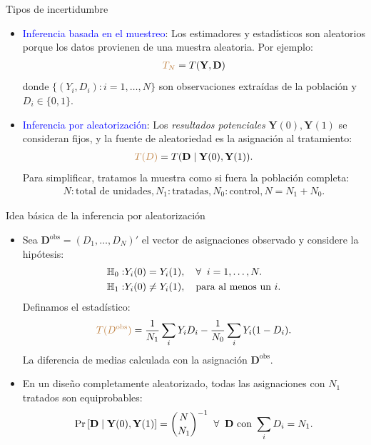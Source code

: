 \documentclass[10pt, xcolor=dvipsnames]{beamer}
\begin{document}
\begin{frame}{Tipos de incertidumbre}
\begin{itemize}
    \item \textcolor{blue}{Inferencia basada en el muestreo}: Los estimadores y estadísticos son aleatorios porque los datos provienen de una muestra aleatoria. Por ejemplo: 
    \vspace{-1.0em}
    \begin{align*}
        \textcolor{brown}{T_N} = T(\textbf{Y},\mathbf{D})
    \end{align*}
    donde $\{(Y_i, D_{i}): i=1, \ldots,N\}$ son observaciones extraídas de la población y \(D_i \in \{0,1\}\).
    \vspace{1.0em}
    \item \textcolor{blue}{Inferencia por aleatorización}: Los \emph{resultados potenciales} $\mathbf{Y}(0), \mathbf{Y}(1)$ se consideran fijos, y la fuente de aleatoriedad es la asignación al tratamiento: 
    \vspace{-1.0em}
    \begin{align*}
        \textcolor{brown}{T(D)} = T(\mathbf{D}\mid \mathbf{Y}(0), \mathbf{Y}(1)).
    \end{align*}
        Para simplificar, tratamos la muestra como si fuera la población completa:
        \vspace{-1em}
    \begin{align*}
        N:\text{total de unidades}, N_1: \text{tratadas}, N_0: \text{control}, N=N_1+N_0.
    \end{align*}
\end{itemize}
\end{frame}


\begin{frame}{Idea básica de la inferencia por aleatorización}
\begin{itemize}
    \item Sea \(\mathbf{D}^{\text{obs}}=(D_1,\ldots,D_N)'\) el vector de asignaciones observado y considere la hipótesis:
    \begin{align*}
    \begin{split}
        \textcolor{black}{\mathbb{H}_{0}}:& Y_i(0) = Y_i(1), \quad \forall \;\; i=1, \ldots, N. \\
        \textcolor{black}{\mathbb{H}_{1}}:& Y_i(0) \neq Y_i(1), \quad \text{para al menos un } i.
    \end{split}
    \end{align*}
    Definamos el estadístico:
    \[
        \textcolor{brown}{T({D^\text{obs}})} = \frac{1}{N_1}\sum_{i} Y_i D_i
          - \frac{1}{N_0}\sum_{i} Y_i (1-D_i).
    \]
    La diferencia de medias calculada con la asignación \(\mathbf{D}^{\text{obs}}\).
    \vspace{0.5em}
    \item En un diseño completamente aleatorizado, todas las asignaciones con \(N_1\) tratados son equiprobables:
    \[
        \text{Pr}\left[\mathbf{D}\mid \mathbf{Y}(0),\mathbf{Y}(1)\right]
        = \binom{N}{N_1}^{-1}
        \;\; \forall \;\;  \mathbf{D}\text{ con }\sum_{i} D_i=N_1.
    \]
\end{itemize}
\end{frame}
\end{document}
